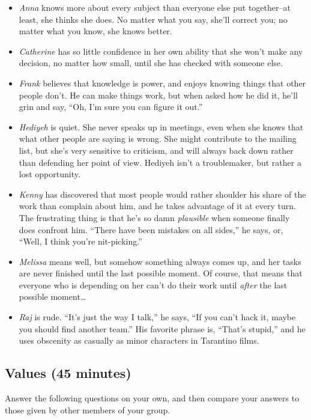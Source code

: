 \documentclass[10pt,statementpaper]{memoir}
\begin{document}
\begin{itemize}
\item
  \emph{Anna} knows more about every subject than everyone else put
  together--at least, she thinks she does. No matter what you say,
  she'll correct you; no matter what you know, she knows better.
\item
  \emph{Catherine} has so little confidence in her own ability that she
  won't make any decision, no matter how small, until she has checked
  with someone else.
\item
  \emph{Frank} believes that knowledge is power, and enjoys knowing
  things that other people don't. He can make things work, but when
  asked how he did it, he'll grin and say, ``Oh, I'm sure you can figure
  it out.''
\item
  \emph{Hediyeh} is quiet. She never speaks up in meetings, even when
  she knows that what other people are saying is wrong. She might
  contribute to the mailing list, but she's very sensitive to criticism,
  and will always back down rather than defending her point of view.
  Hediyeh isn't a troublemaker, but rather a lost opportunity.
\item
  \emph{Kenny} has discovered that most people would rather shoulder his
  share of the work than complain about him, and he takes advantage of
  it at every turn. The frustrating thing is that he's so damn
  \emph{plausible} when someone finally does confront him. ``There have
  been mistakes on all sides,'' he says, or, ``Well, I think you're
  nit-picking.''
\item
  \emph{Melissa} means well, but somehow something always comes up, and
  her tasks are never finished until the last possible moment. Of
  course, that means that everyone who is depending on her can't do
  their work until \emph{after} the last possible moment\ldots{}
\item
  \emph{Raj} is rude. ``It's just the way I talk,'' he says, ``If you
  can't hack it, maybe you should find another team.'' His favorite
  phrase is, ``That's stupid,'' and he uses obscenity as casually as
  minor characters in Tarantino films.
\end{itemize}

\subsection*{Values (45 minutes)}\label{values-45-minutes}

Answer the following questions on your own, and then compare your
answers to those given by other members of your group.
\end{document}
